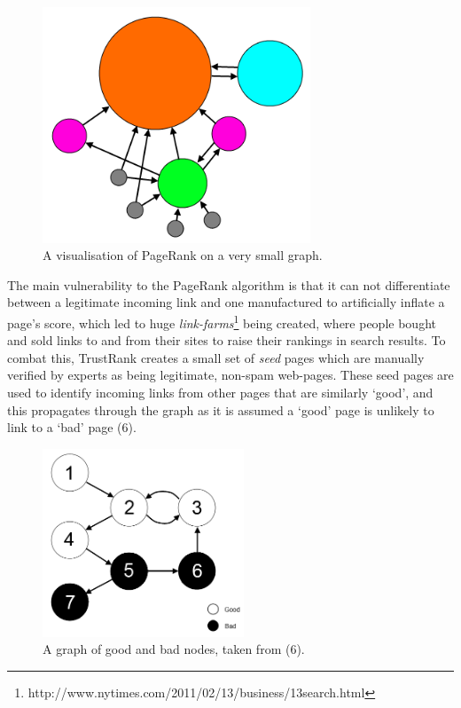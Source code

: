 \documentclass[]{final_report}
\begin{document}
\begin{figure}[ht!]
\centering
\includegraphics[width=80mm]{chap2/pagerank.png}
\caption{A visualisation of PageRank on a very small graph.}
\label{gra:pagerank}
\end{figure}

The main vulnerability to the PageRank algorithm is that it can not differentiate between a legitimate incoming link and one manufactured to artificially inflate a page's score, which led to huge \textsl{link-farms}\footnote{http://www.nytimes.com/2011/02/13/business/13search.html} being created, where people bought and sold links to and from their sites to raise their rankings in search results.  To combat this, TrustRank creates a small set of \textsl{seed} pages which are manually verified by experts as being legitimate, non-spam web-pages. These seed pages are used to identify incoming links from other pages that are similarly `good', and this propagates through the graph as it is assumed a `good' page is unlikely to link to a `bad' page (6).

\begin{figure}[ht!]
\centering
\includegraphics[width=60mm]{chap2/trustrank.png}
\caption{A graph of good and bad nodes, taken from (6).}
\label{gra:trustrank}
\end{figure}
\end{document}
